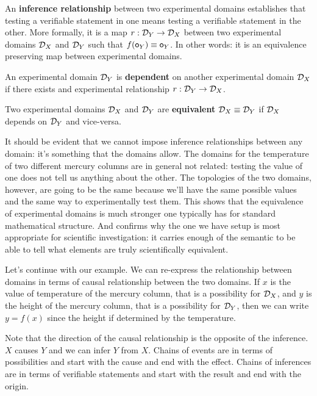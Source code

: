 \documentclass[11pt,letterpaper,fleqn]{memoir} %
\begin{document}
\begin{mathSection}
	\begin{defn}
		An \textbf{inference relationship} between two experimental domains establishes that testing a verifiable statement in one means testing a verifiable statement in the other. More formally, it is a map $r: \mathcal{D}_Y \to \mathcal{D}_X$ between two experimental domains $\mathcal{D}_X$ and $\mathcal{D}_Y$ such that $f(\mathsf{o}_Y) \equiv \mathsf{o}_Y$. In other words: it is an equivalence preserving map between experimental domains.
	\end{defn}
	\begin{defn}
		An experimental domain $\mathcal{D}_Y$ is \textbf{dependent} on another experimental domain $\mathcal{D}_X$ if there exists and experimental relationship $r: \mathcal{D}_Y \to \mathcal{D}_X$.
	\end{defn}
	\begin{defn}
		Two experimental domains $\mathcal{D}_X$ and $\mathcal{D}_Y$ are \textbf{equivalent} $\mathcal{D}_X \equiv \mathcal{D}_Y$ if $\mathcal{D}_X$ depends on $\mathcal{D}_Y$ and vice-versa.
	\end{defn}
\end{mathSection}

It should be evident that we cannot impose inference relationships between any domain: it's something that the domains allow. The domains for the temperature of two different mercury columns are in general not related: testing the value of one does not tell us anything about the other. The topologies of the two domains, however, are going to be the same because we'll have the same possible values and the same way to experimentally test them. This shows that the equivalence of experimental domains is much stronger one typically has for standard mathematical structure. And confirms why the one we have setup is most appropriate for scientific investigation: it carries enough of the semantic to be able to tell what elements are truly scientifically equivalent.

Let's continue with our example. We can re-express the relationship between domains in terms of causal relationship between the two domains. If $x$ is the value of temperature of the mercury column, that is a possibility for $\mathcal{D}_X$, and $y$ is the height of the mercury column, that is a possibility for $\mathcal{D}_Y$, then we can write $y=f(x)$ since the height if determined by the temperature.

Note that the direction of the causal relationship is the opposite of the inference. $X$ causes $Y$ and we can infer $Y$ from $X$. Chains of events are in terms of possibilities and start with the cause and end with the effect. Chains of inferences are in terms of verifiable statements and start with the result and end with the origin.
\end{document}
